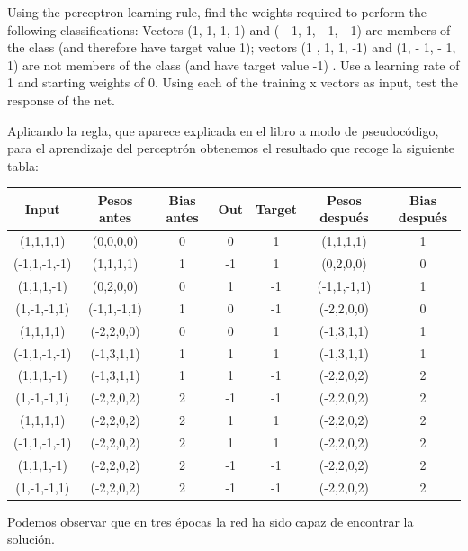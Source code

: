 \begin{problem}[15]
 Using the perceptron learning rule, find the weights required to perform the following
classifications: Vectors (1, 1, 1, 1) and ( - 1, 1, - 1, - 1) are members of the class
(and therefore have target value 1); vectors (1 , 1, 1, -1) and (1, - 1, - 1, 1) are not
members of the class (and have target value -1) . Use a learning rate of 1 and starting
weights of 0. Using each of the training x vectors as input, test the response of the
net.

\solution

Aplicando la regla, que aparece explicada en el libro a modo de pseudocódigo, para el aprendizaje del perceptrón obtenemos el resultado que recoge la siguiente tabla:

\begin{center}
\begin{tabular}{|c|c|c|c|c|c|c|}
\hline
\textbf{Input} & \textbf{Pesos antes} &  \textbf{Bias antes} & \textbf{Out} & \textbf{Target} & \textbf{Pesos después} & \textbf{Bias después} \\
\hline
(1,1,1,1) & (0,0,0,0) & 0 & 0 & 1 & (1,1,1,1) & 1\\
(-1,1,-1,-1) & (1,1,1,1) & 1 & -1 & 1 & (0,2,0,0) & 0\\
(1,1,1,-1) & (0,2,0,0) & 0 & 1 & -1 & (-1,1,-1,1) & 1\\
(1,-1,-1,1) & (-1,1,-1,1) & 1 & 0 & -1 & (-2,2,0,0) & 0\\
(1,1,1,1) & (-2,2,0,0) & 0 & 0 & 1 & (-1,3,1,1) & 1\\
(-1,1,-1,-1) & (-1,3,1,1) & 1 & 1 & 1 & (-1,3,1,1) & 1\\
(1,1,1,-1) & (-1,3,1,1) & 1 & 1 & -1 & (-2,2,0,2) & 2\\
(1,-1,-1,1) & (-2,2,0,2) & 2 & -1 & -1 & (-2,2,0,2) & 2\\
(1,1,1,1) & (-2,2,0,2) & 2 & 1 & 1 & (-2,2,0,2) & 2\\
(-1,1,-1,-1) & (-2,2,0,2) & 2 & 1 & 1 & (-2,2,0,2) & 2\\
(1,1,1,-1) & (-2,2,0,2) & 2 & -1 & -1 & (-2,2,0,2) & 2\\
(1,-1,-1,1) & (-2,2,0,2) & 2 & -1 & -1 & (-2,2,0,2) & 2\\
\hline
\end{tabular}
\end{center}

Podemos observar que en tres épocas la red ha sido capaz de encontrar la solución.
\end{problem}

